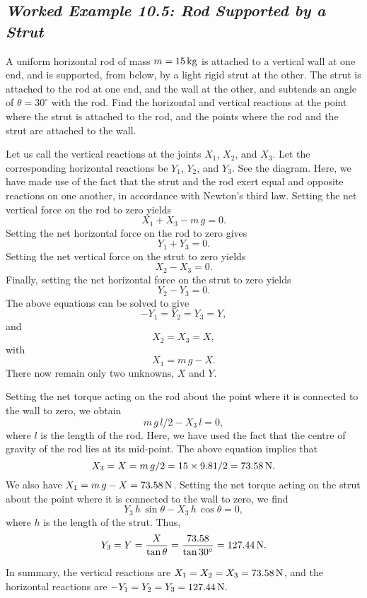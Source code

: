 \subsection*{\em Worked Example 10.5: Rod Supported by a Strut}

 A uniform horizontal rod of mass $m=15\,{\rm kg}$ is
attached to a vertical wall at one end, and is supported, from below, by a
light rigid strut at the other. The strut is attached to the rod at one end,
and the wall at the other, and subtends an angle of $\theta =30^\circ$ with the
rod. Find the horizontal and vertical reactions at the point where the strut is
attached to the rod, and the points where the rod and the strut are attached to
the wall.

\begin{figure*}[h]
\epsfysize=2.5in
\centerline{}
\end{figure*}

 Let us call the vertical reactions at the joints $X_1$, $X_2$, and $X_3$.
Let the corresponding horizontal reactions be $Y_1$, $Y_2$, and $Y_3$. See the diagram.
Here, we have made use of the fact that the strut and the rod exert equal and opposite
reactions on one another, in accordance with Newton's third law.
Setting the net vertical force on the rod to zero yields
$$
X_1 + X_3 - m\,g = 0.
$$
Setting the net horizontal force on the rod to zero gives
$$
Y_1+Y_3 = 0.
$$
Setting the net vertical force on the strut to zero yields
$$
X_2-X_3=0.
$$
Finally, setting the net horizontal force on the strut to zero yields
$$
Y_2-Y_3 = 0.
$$
The above equations can be solved to give
$$
-Y_1 = Y_2= Y_3 = Y,
$$
and
$$
X_2 = X_3 = X,
$$
with 
$$
X_1 = m\,g -X.
$$
There now remain only two unknowns, $X$ and $Y$.

Setting the net torque acting on the rod about the point where it
is connected to the wall to zero, we obtain
$$
m\,g\,l/2 - X_3\,l =0,
$$
where $l$ is the length of the rod. Here, we have used the fact that the
centre of gravity of the rod lies at its mid-point. The above equation implies that
$$
X_3 = X = m\,g/2= 15\times 9.81/2 = 73.58\,{\rm N}.
$$
We also have $X_1=m\,g-X = 73.58\,{\rm N}$.
Setting the net torque acting on the strut about the point where it is
connected to the wall to zero, we find
$$
Y_3\,h\,\sin\theta - X_3\,h\,\cos\theta = 0,
$$
where $h$ is the length of the strut. Thus,
$$
Y_3 = Y = \frac{X}{\tan \theta} = \frac{73.58}{\tan 30^\circ}
=127.44\,{\rm N}.
$$

In summary, the vertical reactions are $X_1=X_2=X_3=
73.58\,{\rm N}$, and the horizontal reactions are $-Y_1=Y_2=Y_3=127.44\,
{\rm N}.$
